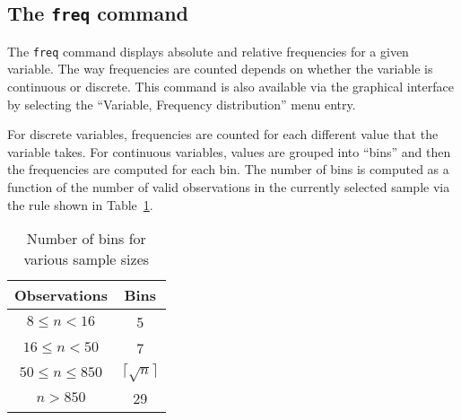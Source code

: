 \subsection{The \texttt{freq} command}
\label{discr-freq}

The \texttt{freq} command displays absolute and relative frequencies
for a given variable. The way frequencies are counted depends on
whether the variable is continuous or discrete. This command is also
available via the graphical interface by selecting the ``Variable,
Frequency distribution'' menu entry.

For discrete variables, frequencies are counted for each different
value that the variable takes. For continuous variables, values are
grouped into ``bins'' and then the frequencies are computed for each
bin. The number of bins is computed as a function of the number of
valid observations in the currently selected sample via the 
rule shown in Table~\ref{tab:bins}.

\begin{table}[htbp]
  \centering
  \begin{tabular}{cc}
\hline
  Observations & Bins \\
\hline
  $8 \le n < 16$ & 5 \\
  $16 \le n < 50 $ & 7 \\
  $50 \le n \le 850 $ & $\lceil \sqrt{n} \rceil$  \\
  $n > 850 $ & 29 \\
\hline
\end{tabular}
\caption{Number of bins for various sample sizes}
\label{tab:bins}
\end{table}

